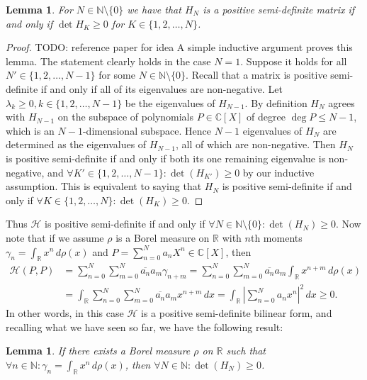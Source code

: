 \documentclass[12pt,oneside]{report}
\newtheorem{lem}[thm]{Lemma}
\begin{document}
\begin{lem}
    For $N \in \mathbb{N} \setminus \{ 0 \}$ we have that $H_{N}$ is a positive semi-definite matrix if and only if $\det H_{K} \geq 0$ for $K \in \{ 1, 2, \dots, N \}$.
\end{lem}
\begin{proof}
    TODO: reference paper for idea A simple inductive argument proves this lemma. The statement clearly holds in the case $N = 1$. Suppose it holds for all $N' \in \{ 1,2,\dots,N-1 \}$ for some $N \in \mathbb{N} \setminus \{ 0 \}$. Recall that a matrix is positive semi-definite if and only if all of its eigenvalues are non-negative. Let $\lambda_{k} \geq 0, k \in \{ 1,2,\dots,N-1 \}$ be the eigenvalues of $H_{N-1}$. By definition $H_{N}$ agrees with $H_{N-1}$ on the subspace of polynomials $P \in \mathbb{C}[X]$ of degree $\deg P \leq N-1$, which is an $N-1$-dimensional subspace. Hence $N-1$ eigenvalues of $H_{N}$ are determined as the eigenvalues of $H_{N-1}$, all of which are non-negative. Then $H_{N}$ is positive semi-definite if and only if both its one remaining eigenvalue is non-negative, and $\forall K' \in \{ 1,2,\dots,N-1 \}: \det (H_{K'}) \geq 0$ by our inductive assumption. This is equivalent to saying that $H_{N}$ is positive semi-definite if and only if $\forall K \in \{ 1,2,\dots,N \}: \det(H_{K}) \geq 0$.
\end{proof}

Thus $\mathcal{H}$ is positive semi-definite if and only if $\forall N \in \mathbb{N} \setminus \{ 0 \}: \det(H_{N}) \geq 0$. Now note that if we assume $\rho$ is a Borel measure on $\mathbb{R}$ with $n$th moments $\gamma_{n} = \int _{\mathbb{R}} x^{n} \, d\rho(x)$ and $P = \sum_{n=0}^{N} a_{n}X^{n} \in \mathbb{C}[X]$, then
\begin{align*}
\mathcal{H}(P,P) &= \sum_{n=0}^{N} \sum_{m=0}^{N} \overline{a_{n}}a_{m} \gamma_{n+m} = \sum_{n=0}^{N} \sum_{m=0}^{N} \overline{a_{n}}a_{m} \int _{\mathbb{R}} x^{n+m} \, d\rho(x) \\
&= \int _{\mathbb{R}} \sum_{n=0}^{N} \sum_{m=0}^{N} \overline{a_{n}}a_{m} x^{n+m} \, dx = \int _{\mathbb{R}} \left| \sum_{n=0}^{N} a_{n} x^{n} \right|^{2} \, dx \geq 0.
\end{align*}
In other words, in this case $\mathcal{H}$ is a positive semi-definite bilinear form, and recalling what we have seen so far, we have the following result:

\begin{lem}\label{exists-easy-dir}
    If there exists a Borel measure $\rho$ on $\mathbb{R}$ such that $\forall n \in \mathbb{N}: \gamma_{n} = \int _{\mathbb{R}} x^{n} \, d\rho(x)$, then $\forall N \in \mathbb{N}: \det(H_{N}) \geq 0$.
\end{lem}
\end{document}
